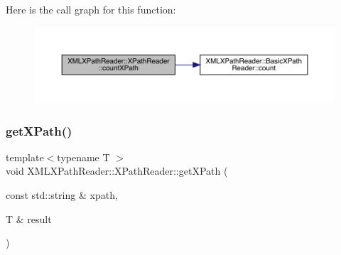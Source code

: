 Here is the call graph for this function\+:
\nopagebreak
\begin{figure}[H]
\begin{center}
\leavevmode
\includegraphics[width=350pt]{d3/d5a/classXMLXPathReader_1_1XPathReader_a9fd76703ea5321a4666ca9a0c07a222a_cgraph}
\end{center}
\end{figure}
\mbox{\label{classXMLXPathReader_1_1XPathReader_abbd673bc00e75502126b2cca246ff6f4}} 
\subsubsection{\texorpdfstring{getXPath()}{getXPath()}\hspace{0.1cm}{\footnotesize\ttfamily [1/6]}}
{\footnotesize\ttfamily template$<$typename T $>$ \\
void X\+M\+L\+X\+Path\+Reader\+::\+X\+Path\+Reader\+::get\+X\+Path (\begin{DoxyParamCaption}\item[{const std\+::string \&}]{xpath,  }\item[{T \&}]{result }\end{DoxyParamCaption})\hspace{0.3cm}{\ttfamily [inline]}}

